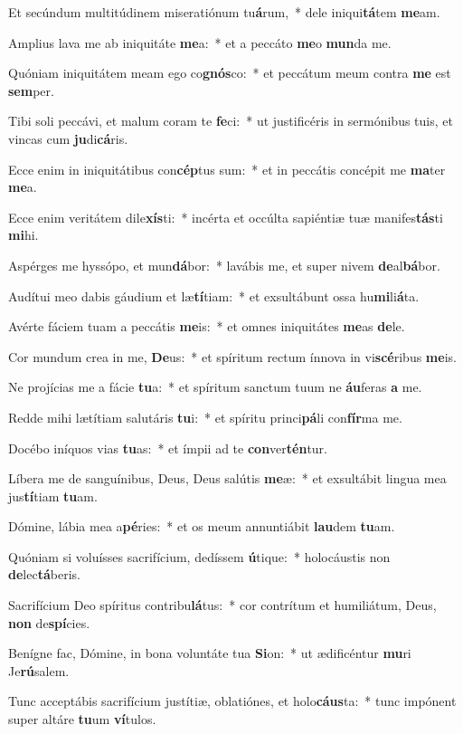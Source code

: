 \item Et secúndum multitúdinem miseratiónum tu\textbf{á}rum,~* dele iniqui\textbf{tá}tem \textbf{me}am.
\item Amplius lava me ab iniquitáte \textbf{me}a:~* et a peccáto \textbf{me}o \textbf{mun}da me.
\item Quóniam iniquitátem meam ego co\textbf{gnós}co:~* et peccátum meum contra \textbf{me} est \textbf{sem}per.
\item Tibi soli peccávi, et malum coram te \textbf{fe}ci:~* ut justificéris in sermónibus tuis, et vincas cum \textbf{ju}di\textbf{cá}ris.
\item Ecce enim in iniquitátibus con\textbf{cép}tus sum:~* et in peccátis concépit me \textbf{ma}ter \textbf{me}a.
\item Ecce enim veritátem dile\textbf{xís}ti:~* incérta et occúlta sapiéntiæ tuæ manifes\textbf{tás}ti \textbf{mi}hi.
\item Aspérges me hyssópo, et mun\textbf{dá}bor:~* lavábis me, et super nivem \textbf{de}al\textbf{bá}bor.
\item Audítui meo dabis gáudium et læ\textbf{tí}tiam:~* et exsultábunt ossa hu\textbf{mi}li\textbf{á}ta.
\item Avérte fáciem tuam a peccátis \textbf{me}is:~* et omnes iniquitátes \textbf{me}as \textbf{de}le.
\item Cor mundum crea in me, \textbf{De}us:~* et spíritum rectum ínnova in vi\textbf{scé}ribus \textbf{me}is.
\item Ne projícias me a fácie \textbf{tu}a:~* et spíritum sanctum tuum ne \textbf{áu}feras \textbf{a} me.
\item Redde mihi lætítiam salutáris \textbf{tu}i:~* et spíritu princi\textbf{pá}li con\textbf{fír}ma me.
\item Docébo iníquos vias \textbf{tu}as:~* et ímpii ad te \textbf{con}ver\textbf{tén}tur.
\item Líbera me de sanguínibus, Deus, Deus salútis \textbf{me}æ:~* et exsultábit lingua mea jus\textbf{tí}tiam \textbf{tu}am.
\item Dómine, lábia mea a\textbf{pé}ries:~* et os meum annuntiábit \textbf{lau}dem \textbf{tu}am.
\item Quóniam si voluísses sacrifícium, dedíssem \textbf{ú}tique:~* holocáustis non \textbf{de}lec\textbf{tá}beris.
\item Sacrifícium Deo spíritus contribu\textbf{lá}tus:~* cor contrítum et humiliátum, Deus, \textbf{non} de\textbf{spí}cies.
\item Benígne fac, Dómine, in bona voluntáte tua \textbf{Si}on:~* ut ædificéntur \textbf{mu}ri Je\textbf{rú}salem.
\item Tunc acceptábis sacrifícium justítiæ, oblatiónes, et holo\textbf{cáus}ta:~* tunc impónent super altáre \textbf{tu}um \textbf{ví}tulos.
